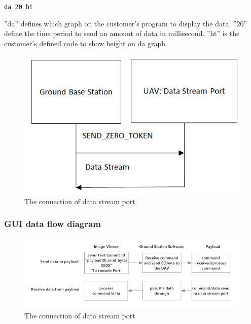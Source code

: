 \documentclass[oneside]{ecsgdp}         %
\begin{document}
\begin{center}
\texttt{da 20 ht}
\end{center}

''da'' defines which graph on the customer's program to display the data. ''20'' define the time period to send an amount of data in millisecond. ''ht'' is the customer's defined code to show height on da graph. 


\begin{center}
\begin{figure}[!hbtp]
\includegraphics[scale=0.5]{connect_command.png} 
\caption{The connection of data stream port\label{GCS_connect_command}}
\end{figure}
\end{center}

\subsubsection*{GUI data flow diagram}

\begin{center}
\begin{figure}[!hbtp]
\includegraphics[scale=0.6]{GCS_Payload_communication.PNG} 
\caption{The connection of data stream port\label{GCS_Payload_comm}}
\end{figure}
\end{center}
\end{document}
